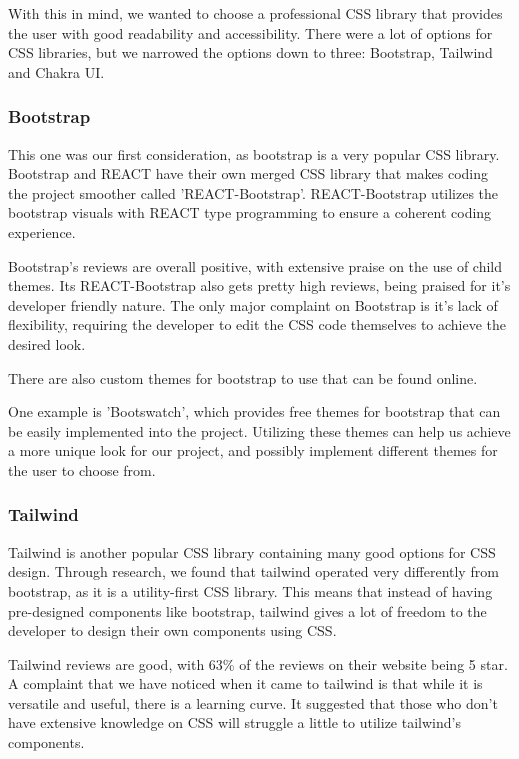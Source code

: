 \documentclass[12pt]{article}
\begin{document}
With this in mind, we wanted to choose a professional CSS library that provides the user with good readability and accessibility.
There were a lot of options for CSS libraries, but we narrowed the options down to three: Bootstrap, Tailwind and Chakra UI.

\subsubsection{Bootstrap}
This one was our first consideration, as bootstrap is a very popular CSS library.
Bootstrap and REACT have their own merged CSS library that makes coding the project smoother called 'REACT-Bootstrap'.
REACT-Bootstrap utilizes the bootstrap visuals with REACT type programming to ensure a coherent coding experience.

Bootstrap's reviews are overall positive, with extensive praise on the use of child themes.
Its REACT-Bootstrap also gets pretty high reviews, being praised for it's developer friendly nature.
The only major complaint on Bootstrap is it's lack of flexibility, requiring the developer to edit the CSS code themselves to achieve the desired look.

There are also custom themes for bootstrap to use that can be found online.

One example is 'Bootswatch', which provides free themes for bootstrap that can be easily implemented into the project.
Utilizing these themes can help us achieve a more unique look for our project, and possibly implement different themes for the user to choose from.

\subsubsection{Tailwind}
Tailwind is another popular CSS library containing many good options for CSS design.
Through research, we found that tailwind operated very differently from bootstrap, as it is a utility-first CSS library.
This means that instead of having pre-designed components like bootstrap, tailwind gives a lot of freedom to the developer to design their own components using CSS.

Tailwind reviews are good, with 63\% of the reviews on their website being 5 star.
A complaint that we have noticed when it came to tailwind is that while it is versatile and useful, there is a learning curve.
It suggested that those who don't have extensive knowledge on CSS will struggle a little to utilize tailwind's components.
\end{document}

